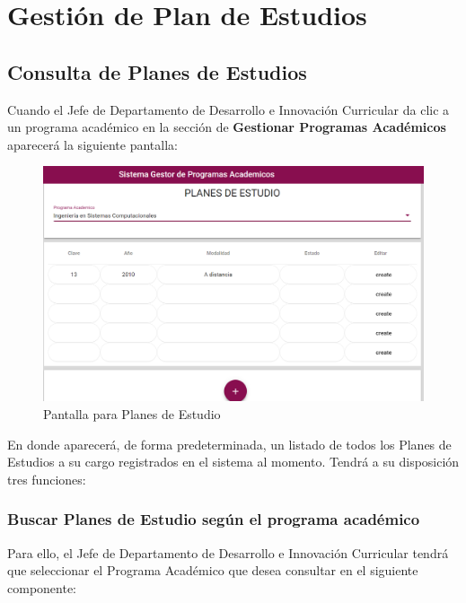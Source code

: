 
\chapter{Gestión de Plan de Estudios}
\section{Consulta de Planes de Estudios}
Cuando el Jefe de Departamento de Desarrollo e Innovación Curricular da clic a un programa académico en la sección de \textbf{Gestionar Programas Académicos} aparecerá la siguiente pantalla:


\begin{figure}[!hbtp]
	\centering
	\hypertarget{consultarPE}{\includegraphics[width=0.7\linewidth]{images/SP4-GPE/consultar}}
	\caption{Pantalla para Planes de Estudio}
	\label{consultarPE}
\end{figure}

En donde aparecerá, de forma predeterminada, un listado de todos los Planes de Estudios a su cargo registrados en el sistema al momento. Tendrá a su disposición tres funciones:

\subsection{Buscar Planes de Estudio según el programa académico}

Para ello, el Jefe de Departamento de Desarrollo e Innovación Curricular tendrá que seleccionar el Programa Académico que desea consultar en el siguiente componente:

